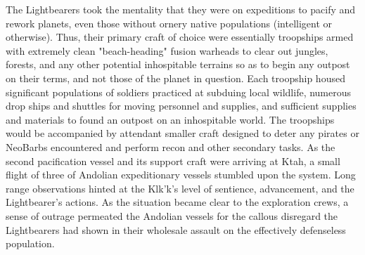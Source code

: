 \begin{itemize}
 The Lightbearers took the mentality that they were on expeditions to
pacify and rework planets, even those without ornery native
populations (intelligent or otherwise). Thus, their primary craft of
choice were essentially troopships armed with extremely clean
"beach-heading" fusion warheads to clear out jungles, forests, and any
other potential inhospitable terrains so as to begin any outpost on
their terms, and not those of the planet in question. Each troopship
housed significant populations of soldiers practiced at subduing local
wildlife, numerous drop ships and shuttles for moving personnel and
supplies, and sufficient supplies and materials to found an outpost on
an inhospitable world. The troopships would be accompanied by
attendant smaller craft designed to deter any pirates or NeoBarbs
encountered and perform recon and other secondary tasks. As the second
pacification vessel and its support craft were arriving at Ktah, a
small flight of three of Andolian expeditionary vessels stumbled upon
the system.  Long range observations hinted at the Klk'k's level of
sentience, advancement, and the Lightbearer's actions. As the
situation became clear to the exploration crews, a sense of outrage
permeated the Andolian vessels for the callous disregard the
Lightbearers had shown in their wholesale assault on the effectively
defenseless population.


\end{itemize}
